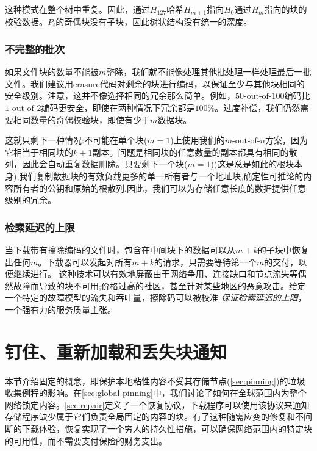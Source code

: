 这种模式在整个树中重复。因此，通过$H_{127}$哈希$H_{m+1}$指向$H_0$通过$H_{m}$指向的块的校验数据。$P_i$的奇偶块没有子块，因此树状结构没有统一的深度。

\subsubsection{不完整的批次}

如果文件块的数量不能被$m$整除，我们就不能像处理其他批处理一样处理最后一批文件。我们建议用erasure代码对剩余的块进行编码，以保证至少与其他块相同的安全级别。注意，这并不像选择相同的冗余那么简单。例如，$50\text{-out-of-}100$编码比$1\text{-out-of-}2$编码更安全，即使在两种情况下冗余都是$100\%$。过度补偿，我们仍然需要相同数量的奇偶校验块，即使有少于$m$数据块。

这就只剩下一种情况:不可能在单个块($m=1$)上使用我们的$m\text{-out-of-}n$方案，因为它相当于相同块的$k+1$副本。问题是相同块的任意数量的副本都具有相同的散列，因此会自动重复数据删除。只要剩下一个块($m=1$)(这是总是如此的根块本身),我们复制数据块的有效负载更多的单一所有者与一个地址块,确定性可推论的内容所有者的公钥和原始的根散列,因此，我们可以为存储任意长度的数据提供任意级别的冗余。

\subsubsection{检索延迟的上限}

当下载带有擦除编码的文件时，包含在中间块下的数据可以从$m+k$的子块中恢复出任何$m$。下载器可以发起对所有$m+k$的请求，只需要等待第一个$m$的交付，以便继续进行。
这种技术可以有效地屏蔽由于网络争用、连接缺口和节点流失等偶然故障而导致的块不可用;价格过高的社区，甚至针对某些地区的恶意攻击。给定一个特定的故障模型的流失和吞吐量，擦除码可以被校准
\emph{保证检索延迟的上限}，一个强有力的服务质量主张。





\section{钉住、重新加载和丢失块通知\statusyellow}\label{sec:reupload}

本节介绍固定的概念，即保护本地粘性内容不受其存储节点(\ref{sec:pinning})的垃圾收集例程的影响。在\ref{sec:global-pinning}中，我们讨论了如何在全球范围内为整个网络锁定内容。\ref{sec:repair}定义了一个恢复协议，下载程序可以使用该协议来通知存储程序缺少属于它们负责全局固定的内容的块。有了这种随需应变的修复和不间断的下载体验，恢复实现了一个穷人的持久性措施，可以确保网络范围内的特定块的可用性，而不需要支付保险的财务支出。

